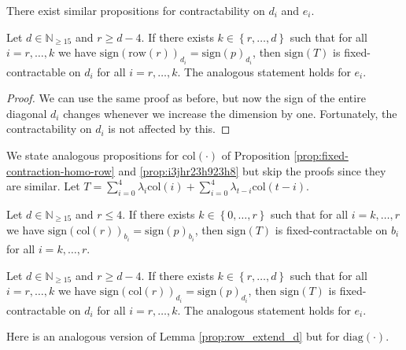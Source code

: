 There exist similar propositions for contractability on \( d_i \) and \( e_i \).

\begin{proposition}\label{prop:i3jhr23h923h8}
    Let \( d \in \mathbb{N}_{\geq 15} \) and \( r \geq d-4 \). If there exists \( k \in \left\{ r, \dots, d \right\} \) such that for all \( i = r, \dots, k\) we have \(  \mathrm{sign}(\mathrm{row}(r))_{d_i} = \mathrm{sign}(p)_{d_i} \),
then  \( \mathrm{sign}(T) \) is fixed-contractable on \( d_i \) for all \( i = r, \dots, k\). The analogous statement holds for \( e_i \).
\end{proposition}

\begin{proof}
    We can use the same proof as before, but now the sign of the entire diagonal $d_{i}$ changes whenever we increase the dimension by one. Fortunately, the contractability on $d_{i}$ is not affected by this. 
\end{proof}

We state analogous propositions for \( \mathrm{col}(\cdot) \) of Proposition \ref{prop:fixed-contraction-homo-row} and \ref{prop:i3jhr23h923h8} but skip the proofs since they are similar. Let \(  T = \sum_{i=0}^{4}  \lambda_{i} \mathrm{col}(i) + \sum_{i=0}^{4}  \lambda_{t-i} \mathrm{col}(t-i) \).

\begin{proposition}\label{prop:fixed-contraction-homo-col}
    Let \( d \in \mathbb{N}_{\geq 15} \) and \( r \leq 4 \). If there exists \( k \in \left\{ 0, \dots, r \right\} \) such that for all \( i = k, \dots, r\) we have \(  \mathrm{sign}(\mathrm{col}(r))_{b_i} = \mathrm{sign}(p)_{b_i} \),
    then  \( \mathrm{sign}(T) \) is fixed-contractable on \( b_i \) for all \( i = k, \dots, r \).
\end{proposition}

\begin{proposition}\label{prop:23e232sdada2kmkl}
    Let \( d \in \mathbb{N}_{\geq 15} \) and \( r \geq d-4 \). If there exists \( k \in \left\{ r, \dots, d \right\} \) such that for all \( i = r, \dots, k\) we have \(  \mathrm{sign}(\mathrm{col}(r))_{d_i} = \mathrm{sign}(p)_{d_i} \),
then  \( \mathrm{sign}(T) \) is fixed-contractable on \( d_i \) for all \( i = r, \dots, k\). The analogous statement holds for \( e_i \).
\end{proposition}

Here is an analogous version of Lemma \ref{prop:row_extend_d} but for \( \mathrm{diag}(\cdot) \).

